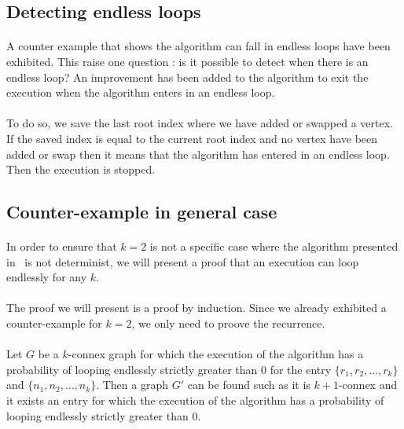 

\subsection{Detecting endless loops}
\paragraph{}
A counter example that shows the algorithm can fall in endless loops have been
exhibited. This raise one question : is it possible to detect when there is an
endless loop? An improvement has been added to the algorithm to exit the
execution when the algorithm enters in an endless loop.

\paragraph{}
To do so, we save the last root index where we have added or swapped a vertex. If
the saved index is equal to the current root index and no vertex have been
added or swap then it means that the algorithm has entered in an endless loop. Then
the execution is stopped.

\subsection{Counter-example in general case}
\paragraph{}
In order to ensure that $k=2$ is not a specific case where the algorithm
presented in~\cite{JS94} is not determinist, we will present a proof that an
execution can loop endlessly for any $k$.

\paragraph{}
The proof we will present is a proof by induction. Since we already exhibited
a counter-example for $k=2$, we only need to proove the recurrence.

\paragraph{}
Let $G$ be a $k$-connex graph for which the execution of the algorithm has a
probability of looping endlessly strictly greater than $0$ for the entry
$\{r_1,r_2, \dots, r_k\}$ and $\{n_1,n_2, \dots, n_k\}$. Then a graph $G'$ can
be found such as it is $k+1$-connex and it exists an entry for which the
execution of the algorithm has a probability of looping endlessly strictly
greater than $0$.

